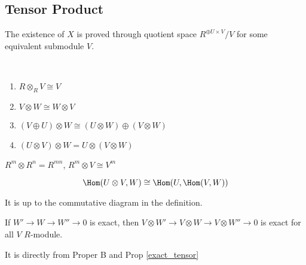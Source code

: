 \subsection{Tensor Product}
\begin{remark}
    The existence of  $ X  $ is proved through quotient space  $ R^{\oplus U\times V}/V $ for some equivalent submodule  $ V $.  
\end{remark}
\begin{proposition}[Proper A]
    \,
    \begin{enumerate}[(1)]
        \item  $ R\otimes_R V\cong V $
        \item  $ V\otimes W\cong W\otimes V $
        \item  $ (V\oplus U)\otimes W\cong (U\otimes W)\oplus (V\otimes W) $
        \item  $ (U\otimes V)\otimes W=U\otimes (V\otimes W) $    
    \end{enumerate}
\end{proposition}
\begin{example}
     $ R^m\otimes R^n=R^{mn} $,  $ R^m\otimes V\cong V^m $  
\end{example}
\begin{proposition}[Proper B]
    \[\Hom(U\otimes V,W)\cong \Hom(U,\Hom(V,W))\]
\end{proposition}
\begin{remark}
    It is up to the commutative diagram in the definition.
\end{remark}
\begin{proposition}[Proper C]
    If  $ W'\rightarrow W\rightarrow W''\rightarrow 0 $ is exact, then  $ V\otimes W'\rightarrow V\otimes W\rightarrow V\otimes W''\rightarrow 0 $ is exact for all $ V  $  $ R  $-module.
\end{proposition}
\begin{remark}
    It is directly from Proper B and Prop \ref{exact_tensor}
\end{remark}

